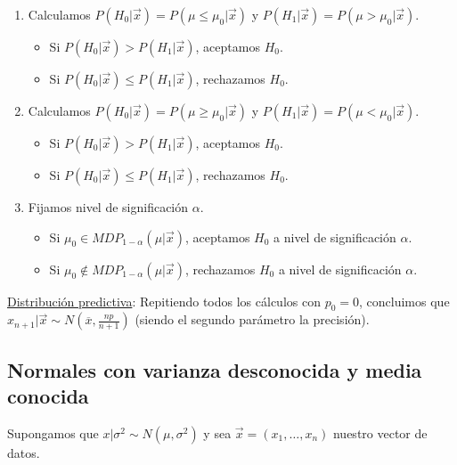 \begin{enumerate}
    \item Calculamos $P(H_0 | \vec{x}) = P(\mu\leq \mu_0 |\vec{x})$ y $P(H_1 | \vec{x}) = P(\mu> \mu_0 | \vec{x})$.
          \begin{itemize}
              \item Si $P(H_0 | \vec{x}) > P(H_1 | \vec{x})$, aceptamos $H_0$.
              \item Si $P(H_0 | \vec{x}) \leq P(H_1 | \vec{x})$, rechazamos $H_0$.
          \end{itemize}
    \item Calculamos $P(H_0 | \vec{x}) = P(\mu \ge \mu_0 |\vec{x})$ y $P(H_1 | \vec{x}) = P(\mu < \mu_0 | \vec{x})$.
          \begin{itemize}
              \item Si $P(H_0 | \vec{x}) > P(H_1 | \vec{x})$, aceptamos $H_0$.
              \item Si $P(H_0 | \vec{x}) \leq P(H_1 | \vec{x})$, rechazamos $H_0$.
          \end{itemize}
    \item Fijamos nivel de significación $\alpha$.
          \begin{itemize}
              \item Si $\mu_0 \in MDP_{1 - \alpha}(\mu | \vec{x})$, aceptamos $H_0$ a nivel de significación $\alpha$.
              \item Si $\mu_0 \not\in MDP_{1 - \alpha}(\mu| \vec{x})$, rechazamos $H_0$ a nivel de significación $\alpha$.
          \end{itemize}
\end{enumerate}
\underline{Distribución predictiva}:
Repitiendo todos los cálculos con $p_0 = 0$, concluimos que $x_{n+1} | \vec{x} \sim N\left( \overline{x}, \frac{np}{n+1} \right)$ (siendo el segundo parámetro la precisión).

\subsection{Normales con varianza desconocida y media conocida}

Supongamos que $x | \sigma^2 \sim N(\mu,\sigma^2)$ y sea $\vec{x} = (x_1, \ldots, x_n)$ nuestro vector de datos.

